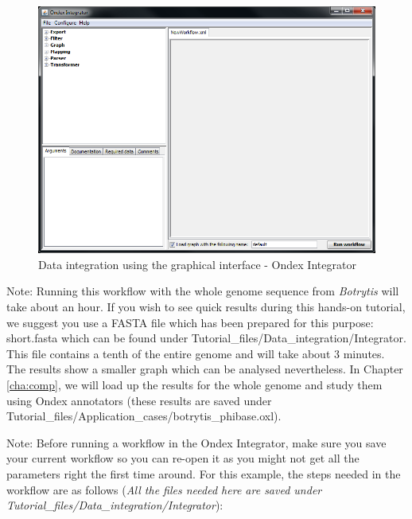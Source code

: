 \begin{figure}[H]
\centering
\includegraphics[scale=0.5]{images/Oct12/integrator.png} 
\caption{Data integration using the graphical interface - Ondex Integrator}
\label{fig:integrator}
\end{figure}


Note: Running this workflow with the whole genome sequence from \textit{Botrytis} will take about an hour. 
If you wish to see quick results during this hands-on tutorial, we suggest you use a FASTA file which has been prepared for this purpose: 
short.fasta which can be found under Tutorial\_files/Data\_integration/Integrator. 
This file contains a tenth of the entire genome and will take about 3 minutes. 
The results show a smaller graph which can be analysed nevertheless. 
In Chapter \ref{cha:comp}, we will load up the results for the whole genome and study them using
Ondex annotators (these results are saved under Tutorial\_files/Application\_cases/botrytis\_phibase.oxl).

Note: Before running a workflow in the Ondex Integrator, make sure you save your current workflow 
so you can re-open it as you might not get all the parameters right the first time around.
For this example, the steps needed in the workflow are as follows
({\em{All the files needed here are saved under Tutorial\_files/Data\_integration/Integrator}}):

